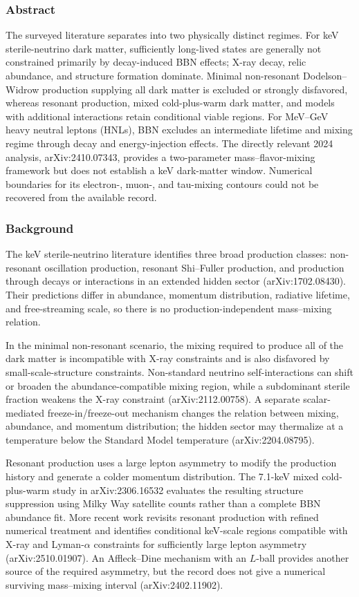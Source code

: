 \documentclass[11pt,a4paper]{article}
\begin{document}
\subsubsection*{Abstract}
The surveyed literature separates into two physically distinct regimes. For keV sterile-neutrino dark matter, sufficiently long-lived states are generally not constrained primarily by decay-induced BBN effects; X-ray decay, relic abundance, and structure formation dominate. Minimal non-resonant Dodelson--Widrow production supplying all dark matter is excluded or strongly disfavored, whereas resonant production, mixed cold-plus-warm dark matter, and models with additional interactions retain conditional viable regions. For MeV--GeV heavy neutral leptons (HNLs), BBN excludes an intermediate lifetime and mixing regime through decay and energy-injection effects. The directly relevant 2024 analysis, arXiv:2410.07343, provides a two-parameter mass--flavor-mixing framework but does not establish a keV dark-matter window. Numerical boundaries for its electron-, muon-, and tau-mixing contours could not be recovered from the available record.

\subsubsection*{Background}
The keV sterile-neutrino literature identifies three broad production classes: non-resonant oscillation production, resonant Shi--Fuller production, and production through decays or interactions in an extended hidden sector (arXiv:1702.08430). Their predictions differ in abundance, momentum distribution, radiative lifetime, and free-streaming scale, so there is no production-independent mass--mixing relation.

In the minimal non-resonant scenario, the mixing required to produce all of the dark matter is incompatible with X-ray constraints and is also disfavored by small-scale-structure constraints. Non-standard neutrino self-interactions can shift or broaden the abundance-compatible mixing region, while a subdominant sterile fraction weakens the X-ray constraint (arXiv:2112.00758). A separate scalar-mediated freeze-in/freeze-out mechanism changes the relation between mixing, abundance, and momentum distribution; the hidden sector may thermalize at a temperature below the Standard Model temperature (arXiv:2204.08795).

Resonant production uses a large lepton asymmetry to modify the production history and generate a colder momentum distribution. The 7.1-keV mixed cold-plus-warm study in arXiv:2306.16532 evaluates the resulting structure suppression using Milky Way satellite counts rather than a complete BBN abundance fit. More recent work revisits resonant production with refined numerical treatment and identifies conditional keV-scale regions compatible with X-ray and Lyman-\(\alpha\) constraints for sufficiently large lepton asymmetry (arXiv:2510.01907). An Affleck--Dine mechanism with an \(L\)-ball provides another source of the required asymmetry, but the record does not give a numerical surviving mass--mixing interval (arXiv:2402.11902).
\end{document}
